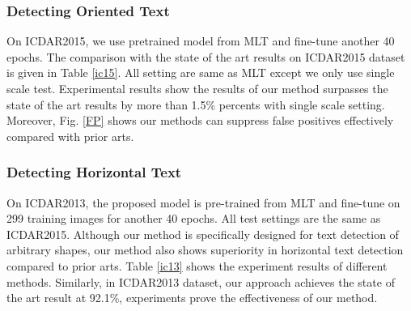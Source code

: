 \documentclass[letterpaper]{article} \usepackage{aaai19}  \usepackage{times}  \usepackage{helvet}  \usepackage{courier}  \usepackage{url}  \usepackage{graphicx}
\begin{document}
\subsubsection{Detecting Oriented Text }
On ICDAR2015, we use pretrained model from MLT and fine-tune another 40 epochs.
The comparison with the state of the art results on ICDAR2015 dataset is given in Table \ref{ic15}.
All setting are same as MLT except we only use single scale test.
Experimental results show the results of our method surpasses the state of the art results by more than 1.5\% percents with single scale setting.
Moreover, Fig. \ref{FP} shows our methods can suppress false positives effectively compared with prior arts.





\subsubsection{Detecting Horizontal Text }
On ICDAR2013, the proposed model is pre-trained from MLT and fine-tune on 299 training images for another 40 epochs.
All test settings are the same as ICDAR2015. 
Although our method is specifically designed for text detection of arbitrary shapes, our method also shows superiority in horizontal text detection compared to prior arts. Table \ref{ic13} shows the experiment results of different methods. 
Similarly, in ICDAR2013 dataset, our approach achieves the state of the art result at 92.1\%, experiments prove the effectiveness of our method.
\end{document}
